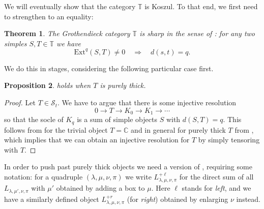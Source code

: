 \documentclass[11pt]{article}
\theoremstyle{plain}
\newtheorem{lemma}{Lemma}[section]
\newtheorem{proposition}[lemma]{Proposition}
\newtheorem{theorem}[lemma]{Theorem}
\theoremstyle{nonumberplain}
\theoremstyle{plain}
\numberwithin{equation}{section}
\theoremstyle{nonumberplain}
\newtheorem{proof}{Proof}
\newcommand\bC{{\mathbb C}}
\newcommand\bT{{\mathbb T}}
\newcommand\cS{{\mathcal S}}
\newcommand\1{{\bf 1}}
\begin{document}
We will eventually show that the category $\bT$ is Koszul. To that end, we first need to strengthen  to an equality:

\begin{theorem}\label{thm:right-def}
  The Grothendieck category ${\bT}$ is sharp in the sense of : for any two simples $S,T\in {\bT}$ we have
  \begin{equation*}
    \mathrm{Ext}^q(S,T)\ne 0\quad \Rightarrow\quad  d(s,t)=q.
  \end{equation*}
\end{theorem}

We do this in stages, considering the following particular case first. 

\begin{proposition}\label{pr.thk}
   holds when $T$ is purely thick. 
\end{proposition}
\begin{proof}
Let $T\in \cS_t$. We have to argue that there is some injective resolution
  \begin{equation*}
    0\to T\to K_0\to K_1\to \cdots
  \end{equation*}
  so that the socle of $K_q$ is a sum of simple objects $S$ with $d(S,T)=q$. This follows from  for the trivial object $T=\bC$ and in general for purely thick $T$ from , which implies that we can obtain an injective resolution for $T$ by simply tensoring  with $T$.
\end{proof}


In order to push past purely thick objects we need a version of \cite[Lemma 3.13]{us0}, requiring some notation: for a quadruple $(\lambda,\mu,\nu,\pi)$ we write $L^{+\ell}_{\lambda,\mu,\nu,\pi}$ for the direct sum of all $L_{\lambda,\mu',\nu,\pi}$ with $\mu'$ obtained by adding a box to $\mu$. Here $\ell$ stands for {\it left}, and we have a similarly defined object $L^{+r}_{\lambda,\mu,\nu,\pi}$ (for {\it right}) obtained by enlarging $\nu$ instead.
\end{document}
